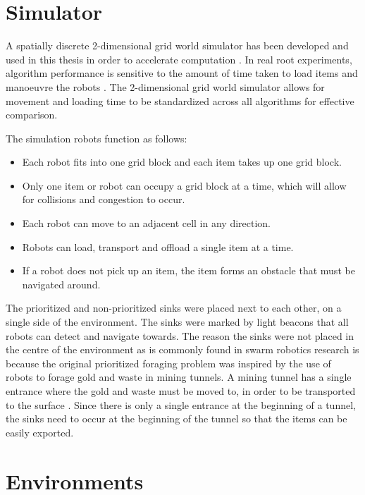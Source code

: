 \section{Simulator}
\label{simulator}
A spatially discrete 2-dimensional grid world simulator has been developed and used in this thesis in order to accelerate computation \cite{sugawara2002swarming}. In real root experiments, algorithm performance is sensitive to the amount of time taken to load items and manoeuvre the robots \cite{ostergaard2001emergent}. The 2-dimensional grid world simulator allows for movement and loading time to be standardized across all algorithms for effective comparison.

The simulation robots function as follows:
\begin{itemize}
	\item Each robot fits into one grid block and each item takes up one grid block. 
	\item Only one item or robot can occupy a grid block at a time, which will allow for collisions and congestion to occur. 
	\item Each robot can move to an adjacent cell in any direction.
	\item Robots can load, transport and offload a single item at a time.
	\item If a robot does not pick up an item, the item forms an obstacle that must be navigated around.
\end{itemize}

The prioritized and non-prioritized sinks were placed next to each other, on a single side of the environment. The sinks were marked by light beacons that all robots can detect and navigate towards. The reason the sinks were not placed in the centre of the environment as is commonly found in swarm robotics research \cite{labella2006division} is because the original prioritized foraging problem was inspired by the use of robots to forage gold and waste in mining tunnels. A mining tunnel has a single entrance where the gold and waste must be moved to, in order to be transported to the surface \cite{brune2010extracting}. Since there is only a single entrance at the beginning of a tunnel, the sinks need to occur at the beginning of the tunnel so that the items can be easily exported.

\section{Environments}
\label{experimentenvironments}

